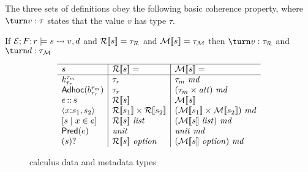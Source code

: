 The three sets of definitions obey the following basic coherence
property, where $\turn v : \tau$ states that the value $v$ has type
$\tau$.

\begin{proposition}
  If $\mathcal{E};F;r \models s \rightsquigarrow v,d$ and ${\cal R}[\![ s ]\!] =
  \tau_{\mathcal{R}}$ and ${\cal M}[\![ s ]\!] = \tau_{\mathcal{M}}$ then $\turn
  v : \tau_{\mathcal{R}}$ and $\turn d : \tau_{\mathcal{M}}$
\end{proposition}


\begin{figure}

\[
\begin{array}{l|l|l}
\hline
s & \repty{s} = & \mdty{s} =  \\
\hline
\Sk & \tau_r &  \tau_m~\mathit{md} \\
\SAdhoc{b} & \tau_r & (\tau_m \times \meta)~\mathit{md} \\
\SPath{e}{s} & \repty{s} & \mdty{s} \\
\SPair{x}{s_1}{s_2} & \repty{s_1} \times \repty{s_2} & \md{\mdty{s_1} \times \mdty{s_2}} \\
\SComp{s}{x}{e} & \repty{s}~\typ{list} & \md{\mdty{s}~\typ{list}}    \\
\SPred{e} & \typ{unit} & \typ{unit}~\mathit{md}\\
\SOption{s} & \repty{s}~\typ{option} & \md{\mdty{s}~\typ{option}} %
\end{array}
\]
\caption{\forest{} calculus data and metadata types}
\label{fig:calculus-types}
\end{figure}


